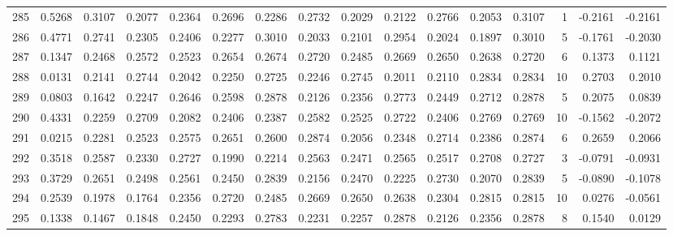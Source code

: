 \begin{tabular}{lrrrrrrrrrrrrrrr}
285 &      0.5268 &  0.3107 &  0.2077 &  0.2364 &  0.2696 &  0.2286 &  0.2732 &  0.2029 &  0.2122 &  0.2766 &   0.2053 &     0.3107 &      1 &                   -0.2161 &                    -0.2161 \\
286 &      0.4771 &  0.2741 &  0.2305 &  0.2406 &  0.2277 &  0.3010 &  0.2033 &  0.2101 &  0.2954 &  0.2024 &   0.1897 &     0.3010 &      5 &                   -0.1761 &                    -0.2030 \\
287 &      0.1347 &  0.2468 &  0.2572 &  0.2523 &  0.2654 &  0.2674 &  0.2720 &  0.2485 &  0.2669 &  0.2650 &   0.2638 &     0.2720 &      6 &                    0.1373 &                     0.1121 \\
288 &      0.0131 &  0.2141 &  0.2744 &  0.2042 &  0.2250 &  0.2725 &  0.2246 &  0.2745 &  0.2011 &  0.2110 &   0.2834 &     0.2834 &     10 &                    0.2703 &                     0.2010 \\
289 &      0.0803 &  0.1642 &  0.2247 &  0.2646 &  0.2598 &  0.2878 &  0.2126 &  0.2356 &  0.2773 &  0.2449 &   0.2712 &     0.2878 &      5 &                    0.2075 &                     0.0839 \\
290 &      0.4331 &  0.2259 &  0.2709 &  0.2082 &  0.2406 &  0.2387 &  0.2582 &  0.2525 &  0.2722 &  0.2406 &   0.2769 &     0.2769 &     10 &                   -0.1562 &                    -0.2072 \\
291 &      0.0215 &  0.2281 &  0.2523 &  0.2575 &  0.2651 &  0.2600 &  0.2874 &  0.2056 &  0.2348 &  0.2714 &   0.2386 &     0.2874 &      6 &                    0.2659 &                     0.2066 \\
292 &      0.3518 &  0.2587 &  0.2330 &  0.2727 &  0.1990 &  0.2214 &  0.2563 &  0.2471 &  0.2565 &  0.2517 &   0.2708 &     0.2727 &      3 &                   -0.0791 &                    -0.0931 \\
293 &      0.3729 &  0.2651 &  0.2498 &  0.2561 &  0.2450 &  0.2839 &  0.2156 &  0.2470 &  0.2225 &  0.2730 &   0.2070 &     0.2839 &      5 &                   -0.0890 &                    -0.1078 \\
294 &      0.2539 &  0.1978 &  0.1764 &  0.2356 &  0.2720 &  0.2485 &  0.2669 &  0.2650 &  0.2638 &  0.2304 &   0.2815 &     0.2815 &     10 &                    0.0276 &                    -0.0561 \\
295 &      0.1338 &  0.1467 &  0.1848 &  0.2450 &  0.2293 &  0.2783 &  0.2231 &  0.2257 &  0.2878 &  0.2126 &   0.2356 &     0.2878 &      8 &                    0.1540 &                     0.0129 \\

\end{tabular}
